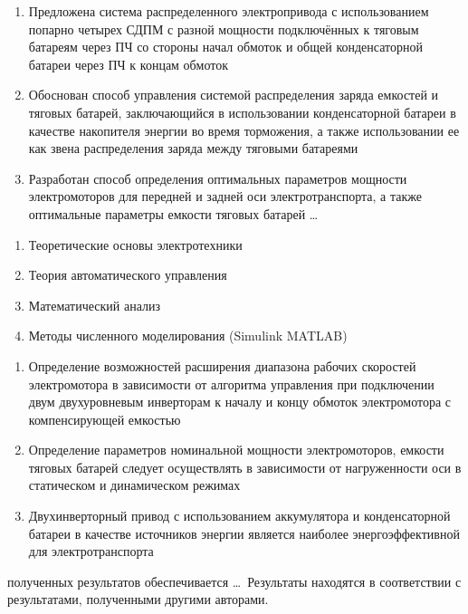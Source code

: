 {\novelty}
\begin{enumerate}
  \item Предложена система распределенного электропривода с использованием попарно четырех  СДПМ с разной мощности подключённых к тяговым батареям через ПЧ со стороны начал 	обмоток и общей конденсаторной батареи через ПЧ к концам обмоток
  \item Обоснован способ управления системой распределения заряда емкостей и тяговых батарей, заключающийся в использовании конденсаторной батареи в качестве накопителя энергии во время торможения, а также использовании ее как звена распределения заряда между тяговыми батареями
  \item Разработан способ определения оптимальных параметров мощности электромоторов для передней и задней оси электротранспорта, а также оптимальные параметры емкости тяговых батарей \ldots
\end{enumerate}


{\methods} 
\begin{enumerate}
	\item Теоретические основы электротехники
	\item Теория автоматического управления
	\item Математический анализ
	\item Методы численного моделирования (Simulink MATLAB)
\end{enumerate}
{}
\begin{enumerate}
  \item Определение возможностей расширения диапазона рабочих скоростей электромотора в зависимости от алгоритма управления при подключении двум двухуровневым инверторам к началу и концу обмоток электромотора с компенсирующей емкостью
  \item Определение параметров номинальной мощности электромоторов, емкости тяговых батарей следует осуществлять в зависимости от нагруженности оси в статическом и динамическом режимах
  \item Двухинверторный привод с использованием аккумулятора и конденсаторной батареи в качестве источников энергии является наиболее энергоэффективной для электротранспорта
\end{enumerate}

{\reliability} полученных результатов обеспечивается \ldots \ Результаты находятся в соответствии с результатами, полученными другими авторами.

